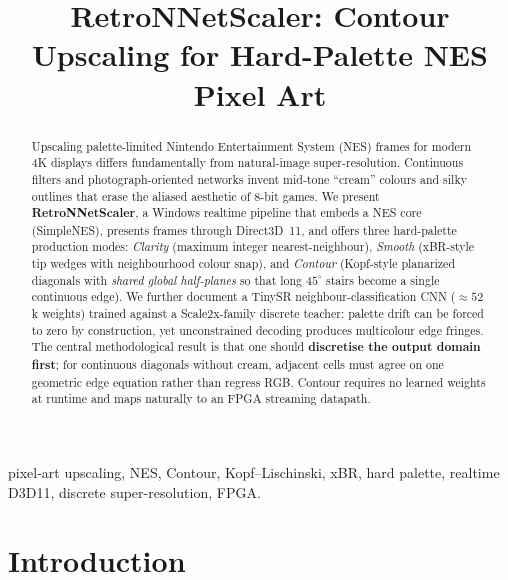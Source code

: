 \documentclass[conference]{IEEEtran}
\begin{document}
\title{RetroNNetScaler: Contour Upscaling for Hard-Palette NES Pixel Art}

\author{
}

\maketitle

\begin{abstract}
Upscaling palette-limited Nintendo Entertainment System (NES) frames for modern
4K displays differs fundamentally from natural-image super-resolution.
Continuous filters and photograph-oriented networks invent mid-tone ``cream''
colours and silky outlines that erase the aliased aesthetic of 8-bit games.
We present \textbf{RetroNNetScaler}, a Windows realtime pipeline that embeds a
NES core (SimpleNES), presents frames through Direct3D~11, and offers three
hard-palette production modes: \emph{Clarity} (maximum integer nearest-neighbour),
\emph{Smooth} (xBR-style tip wedges with neighbourhood colour snap),
and \emph{Contour} (Kopf-style planarized diagonals with \emph{shared global
half-planes} so that long $45^\circ$ stairs become a single continuous edge).
We further document a TinySR neighbour-classification CNN ($\approx\!52$k
weights) trained against a Scale2x-family discrete teacher: palette drift can be forced to
zero by construction, yet unconstrained decoding produces multicolour edge
fringes. The central methodological result is that one should
\textbf{discretise the output domain first}; for continuous diagonals without
cream, adjacent cells must agree on one geometric edge equation rather than
regress RGB. Contour requires no learned weights at runtime and maps naturally
to an FPGA streaming datapath.
\end{abstract}

\begin{IEEEkeywords}
pixel-art upscaling, NES, Contour, Kopf--Lischinski, xBR, hard palette,
realtime D3D11, discrete super-resolution, FPGA.
\end{IEEEkeywords}

\section{Introduction}
\label{sec:intro}
\end{document}
